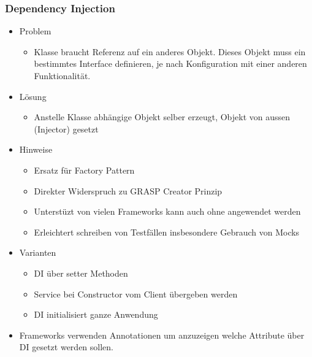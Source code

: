 \documentclass[../ZF_SWEN1.tex]{subfiles}
\begin{document}
\subsubsection{Dependency Injection}
\begin{itemize}
	\item Problem
	\begin{itemize}
		\item Klasse braucht Referenz auf ein anderes Objekt. Dieses Objekt muss ein bestimmtes Interface definieren, je nach Konfiguration mit einer anderen Funktionalität.
	\end{itemize}
	\item Lösung
	\begin{itemize}
		\item Anstelle Klasse abhängige Objekt selber erzeugt, Objekt von aussen (Injector) gesetzt
	\end{itemize}
	\item Hinweise
	\begin{itemize}
		\item Ersatz für Factory Pattern
		\item Direkter Widerspruch zu GRASP Creator Prinzip
		\item Unterstüzt von vielen Frameworks kann auch ohne angewendet werden
		\item Erleichtert schreiben von Testfällen insbesondere Gebrauch von Mocks
	\end{itemize}
	\item Varianten
	\begin{itemize}
		\item DI über setter Methoden
		\item Service bei Constructor vom Client übergeben werden
		\item DI initialisiert ganze Anwendung
	\end{itemize}
	\item Frameworks verwenden Annotationen um anzuzeigen welche Attribute über DI gesetzt werden sollen.
	
\end{itemize}
\end{document}
